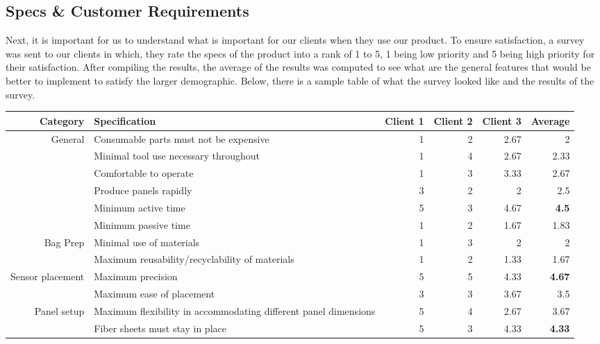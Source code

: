 \documentclass[12pt,letterpaper,notitlepage]{article}
\begin{document}
\subsection{Specs \& Customer Requirements}
Next, it is important for us to understand what is important for our clients when they use our product. To ensure satisfaction, a survey was sent to our clients in which, they rate the specs of the product into a rank of 1 to 5, 1 being low priority and 5 being high priority for their satisfaction. After compiling the results, the average of the results was computed to see what are the general features that would be better to implement to satisfy the larger demographic. Below, there is a sample table of what the survey looked like and the results of the survey.
\begin{table}[H]
  \centering
    \begin{tabular}{rL{5cm}rrr|r}
    \toprule
    \textbf{Category} & \textbf{Specification} & \textbf{Client 1} & \textbf{Client 2} & \textbf{Client 3} & \textbf{Average} \\
    \midrule
    General & Consumable parts must not be expensive & 1     & 2     & 2.67  & 2 \\
          & Minimal tool use necessary throughout & 1     & 4     & 2.67  & 2.33 \\
          & Comfortable to operate & 1     & 3     & 3.33  & 2.67 \\
          & Produce panels rapidly & 3     & 2     & 2     & 2.5 \\
          & Minimum active time & 5     & 3     & 4.67  & \textbf{4.5} \\
          & Minimum passive time & 1     & 2     & 1.67  & 1.83 \\
\hline
    Bag Prep & Minimal use of materials & 1     & 3     & 2     & 2 \\
          & Maximum reusability/recyclability of materials & 1     & 2     & 1.33  & 1.67 \\
\hline
    Sensor placement & Maximum precision & 5     & 5     & 4.33  & \textbf{4.67} \\
          & Maximum ease of placement & 3     & 3     & 3.67  & 3.5 \\
\hline
    Panel setup & Maximum flexibility in accommodating different panel dimensions & 5     & 4     & 2.67  & 3.67 \\
          & Fiber sheets must stay in place & 5     & 3     & 4.33  & \textbf{4.33} \\

\end{tabular}
\end{table}
\end{document}
